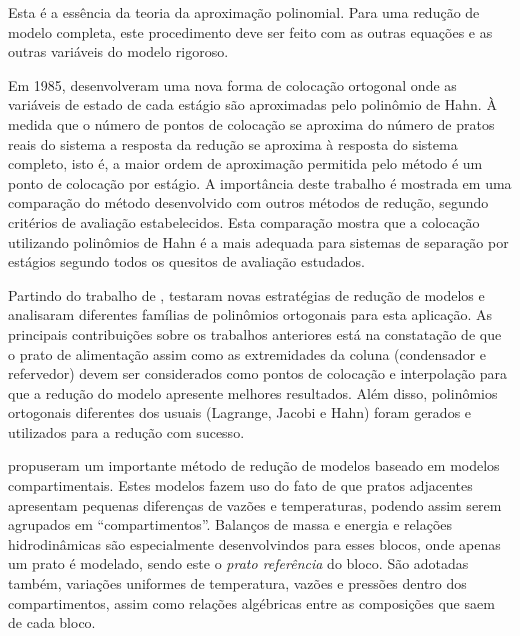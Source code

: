 \begin{enumerate}

Esta é a essência da teoria da aproximação polinomial. Para uma redução de modelo completa, este procedimento deve
ser feito com as outras equações e as outras variáveis do modelo rigoroso.

Em 1985,  desenvolveram uma nova forma de colocação ortogonal onde as variáveis de estado de cada
estágio são aproximadas pelo polinômio de Hahn. À medida que o número de pontos de colocação se aproxima do número
de pratos reais do sistema a resposta da redução se aproxima à resposta do sistema completo, isto é, a maior
ordem de aproximação permitida pelo método é um ponto de colocação por estágio.
A importância deste trabalho é mostrada em uma comparação do método desenvolvido com outros métodos de redução, segundo
critérios de avaliação estabelecidos. Esta comparação mostra que a colocação utilizando polinômios de Hahn
é a mais adequada para sistemas de separação por estágios segundo todos os
quesitos de avaliação estudados.

Partindo do trabalho de ,  testaram novas
estratégias de redução de modelos e analisaram diferentes famílias de polinômios ortogonais
para esta aplicação. As principais contribuições sobre os trabalhos anteriores está na
constatação de que o prato de alimentação assim como as extremidades da coluna (condensador
e refervedor) devem ser considerados como pontos
de colocação e interpolação para que a redução do modelo apresente melhores resultados.
Além disso, polinômios ortogonais diferentes dos usuais (Lagrange, Jacobi e Hahn) foram gerados e utilizados para a redução com sucesso.

 propuseram um importante método de redução de modelos baseado em modelos
compartimentais. Estes modelos fazem uso do fato de que pratos adjacentes apresentam pequenas diferenças de vazões
e temperaturas, podendo assim serem agrupados em ``compartimentos''. Balanços de massa e energia e relações
hidrodinâmicas são especialmente desenvolvindos para esses blocos, onde apenas um prato é modelado, sendo este o
\textit{prato referência} do bloco. São adotadas também, variações uniformes de temperatura, vazões e pressões dentro
dos compartimentos, assim como relações algébricas entre as composições que saem de cada bloco.


\end{enumerate}
